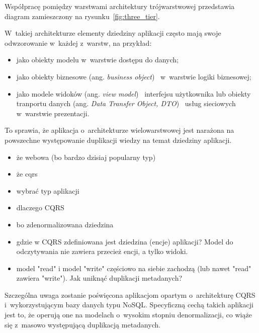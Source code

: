 Współpracę pomiędzy warstwami architektury trójwarstwowej przedstawia diagram zamieszczony na rysunku~\ref{fig:three_tier}.



W~takiej architekturze elementy dziedziny aplikacji często mają swoje odwzorowanie w~każdej z~warstw, na przykład:

\begin{itemize}
 \item jako obiekty modelu w~warstwie dostępu do danych;
 \item jako obiekty biznesowe (ang. \emph{business object})~\cite{business_object} w~warstwie logiki biznesowej;
 \item jako modele widoków (ang. \emph{view model})~\cite{view_model} interfejsu użytkownika lub obiekty tranportu danych (ang. \emph{Data Transfer Object, DTO})~\cite{dto} usług sieciowych w~warstwie prezentacji.
\end{itemize}

To sprawia, że aplikacja o~architekturze wielowarstwowej jest narażona na powszechne występowanie duplikacji wiedzy na temat dziedziny aplikacji.



\begin{itemize}
 \item że webowa (bo bardzo dzisiaj popularny typ)
 \item że cqrs
\end{itemize}


\begin{itemize}
 \item wybrać typ aplikacji
 \item dlaczego CQRS
  \item bo zdenormalizowana dziedzina
  \item gdzie w CQRS zdefiniowana jest dziedzina (encje) aplikacji? Model do odczytywania nie zawiera przecież encji, a tylko widoki.
  \item model "read" i model "write" częściowo na siebie zachodzą (lub nawet "read" zawiera "write"). Jak uniknąć duplikacji metadanych?
\end{itemize}

Szczególna uwaga zostanie poświęcona aplikacjom opartym o~architekturę CQRS i~wykorzystującym bazy danych typu NoSQL.
Specyficzną cechą takich aplikacji jest to, że operują one na modelach o~wysokim stopniu denormalizacji, co wiąże się z~masowo występującą duplikacją metadanych.



